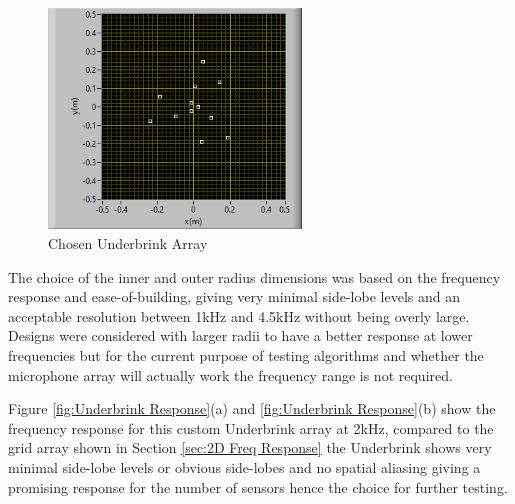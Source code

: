 \documentclass{UoNMCHA}
\numberwithin{equation}{section}
\begin{document}
    \begin{figure} [H]
        \centering
        \includegraphics[keepaspectratio, width = 0.6\textwidth]{Figures/CurrentTestingArray.png}
        \caption{Chosen Underbrink Array}
        \label{fig:Testing Array}
    \end{figure}
    
    The choice of the inner and outer radius dimensions was based on the frequency response and ease-of-building, giving very minimal side-lobe levels and an acceptable resolution between 1kHz and 4.5kHz without being overly large. Designs were considered with larger radii to have a better response at lower frequencies but for the current purpose of testing algorithms and whether the microphone array will actually work the frequency range is not required.
    
    Figure \ref{fig:Underbrink Response}(a) and \ref{fig:Underbrink Response}(b) show the frequency response for this custom Underbrink array at 2kHz, compared to the grid array shown in Section \ref{sec:2D Freq Response} the Underbrink shows very minimal side-lobe levels or obvious side-lobes and no spatial aliasing giving a promising response for the number of sensors hence the choice for further testing.  
\end{document}

